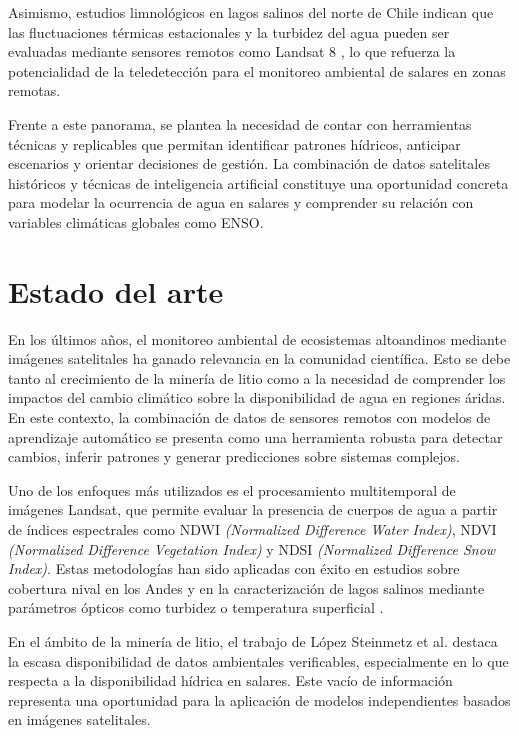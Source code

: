 Asimismo, estudios limnológicos en lagos salinos del norte de Chile indican que las fluctuaciones térmicas estacionales y la turbidez del agua pueden ser evaluadas mediante sensores remotos como Landsat 8 \cite{delosrios2024lakes}, lo que refuerza la potencialidad de la teledetección para el monitoreo ambiental de salares en zonas remotas.

Frente a este panorama, se plantea la necesidad de contar con herramientas técnicas y replicables que permitan identificar patrones hídricos, anticipar escenarios y orientar decisiones de gestión. La combinación de datos satelitales históricos y técnicas de inteligencia artificial constituye una oportunidad concreta para modelar la ocurrencia de agua en salares y comprender su relación con variables climáticas globales como ENSO.


\section{Estado del arte}

En los últimos años, el monitoreo ambiental de ecosistemas altoandinos mediante imágenes satelitales ha ganado relevancia en la comunidad científica. Esto se debe tanto al crecimiento de la minería de litio como a la necesidad de comprender los impactos del cambio climático sobre la disponibilidad de agua en regiones áridas. En este contexto, la combinación de datos de sensores remotos con modelos de aprendizaje automático se presenta como una herramienta robusta para detectar cambios, inferir patrones y generar predicciones sobre sistemas complejos.

Uno de los enfoques más utilizados es el procesamiento multitemporal de imágenes Landsat, que permite evaluar la presencia de cuerpos de agua a partir de índices espectrales como NDWI \textit{(Normalized Difference Water Index)}, NDVI \textit{(Normalized Difference Vegetation Index)} y NDSI \textit{(Normalized Difference Snow Index)}. Estas metodologías han sido aplicadas con éxito en estudios sobre cobertura nival en los Andes \cite{saavedra2018changes} y en la caracterización de lagos salinos mediante parámetros ópticos como turbidez o temperatura superficial \cite{delosrios2024lakes}.

En el ámbito de la minería de litio, el trabajo de López Steinmetz et al. \cite{lopezsteinmetz2024book} destaca la escasa disponibilidad de datos ambientales verificables, especialmente en lo que respecta a la disponibilidad hídrica en salares. Este vacío de información representa una oportunidad para la aplicación de modelos independientes basados en imágenes satelitales.

